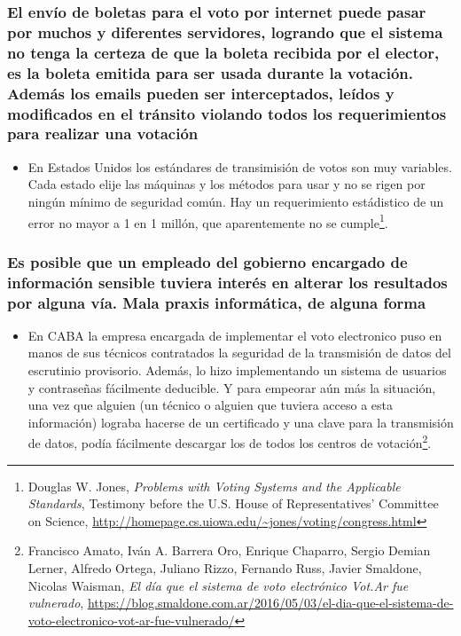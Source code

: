 \subsubsection{El envío de boletas para el voto por internet puede pasar por muchos y diferentes servidores, logrando que el sistema no tenga la certeza de que la boleta recibida por el elector, es la boleta emitida para ser usada durante la votación. Además los emails pueden ser interceptados, leídos y modificados en el tránsito violando todos los requerimientos para realizar una votación}

	\begin{itemize}
		\item En Estados Unidos los estándares de transimisión de votos son muy variables. Cada estado elije las máquinas y los métodos para usar y no se rigen por ningún mínimo de seguridad común. Hay un requerimiento estádistico de un error no mayor a 1 en 1 millón, que aparentemente no se cumple\footnote{Douglas W. Jones, \textit{Problems with Voting Systems and the Applicable Standards}, Testimony before the U.S. House of Representatives' Committee on Science, \url{http://homepage.cs.uiowa.edu/~jones/voting/congress.html}}.
	\end{itemize}

\subsubsection{Es posible que un empleado del gobierno encargado de información sensible tuviera interés en alterar los resultados por alguna vía. Mala praxis informática, de alguna forma}
	
	\begin{itemize}
		\item En CABA la empresa encargada de implementar el voto electronico  puso en manos de sus técnicos contratados la seguridad de la transmisión de datos del escrutinio provisorio. Además, lo hizo implementando un sistema de usuarios y contraseñas fácilmente deducible. Y para empeorar aún más la situación, una vez que alguien (un técnico o alguien que tuviera acceso a esta información) lograba hacerse de un certificado y una clave para la transmisión de datos, podía fácilmente descargar los de todos los centros de votación\footnote{Francisco Amato, Iván A. Barrera Oro, Enrique Chaparro, Sergio Demian Lerner, Alfredo Ortega, Juliano Rizzo, Fernando Russ, Javier Smaldone, Nicolas Waisman, \textit{El día que el sistema de voto electrónico Vot.Ar fue vulnerado}, \url{https://blog.smaldone.com.ar/2016/05/03/el-dia-que-el-sistema-de-voto-electronico-vot-ar-fue-vulnerado/}}.
	\end{itemize}

